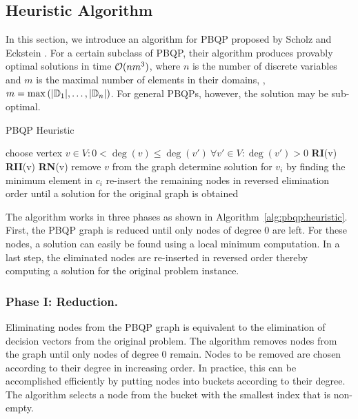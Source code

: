 \subsection{Heuristic Algorithm}
\label{sec:pbqp:heuristic}
In this section, we introduce an algorithm for PBQP proposed by
Scholz and Eckstein \cite{ScholzE02,Eck03}.  For a certain subclass of
PBQP, their algorithm produces provably optimal solutions in time
${\cal O}(n m^3)$, where $n$ is the number of discrete variables and
$m$ is the maximal number of elements in their domains, \ie, $m=\max
\left(|\mathbb D_1|,\ldots,|\mathbb D_n\right|)$. For general
{PBQP}s, however, the solution may be sub-optimal.

\begin{algorithm}
\caption{PBQP Heuristic}
\label{alg:pbqp:heuristic}
\begin{algorithmic}
  \STATE {}
  \STATE choose vertex $v \in V: 0 < \deg (v) \leq \deg (v') \ \forall v'
  \in V : \deg(v') > 0$
  \STATE \textbf{RI}(v)
  \STATE \textbf{RII}(v)
  \ELSE
  \STATE \textbf{RN}(v) 
  \ENDIF
  \STATE remove $v$ from the graph
  \ENDWHILE
  \STATE
  \STATE {}
  \STATE determine solution for $v_i$ by finding the minimum element
  in $c_i$
  \ENDFOR
  \STATE
  \STATE {}
  \STATE re-insert the remaining nodes in reversed elimination order
  until a solution for the original graph is obtained
\end{algorithmic}
\end{algorithm}
The algorithm works in three phases as shown in
Algorithm~\ref{alg:pbqp:heuristic}. First, the PBQP graph is reduced
until only nodes of degree $0$ are left. For these nodes, a solution
can easily be found using a local minimum computation. In a last step,
the eliminated nodes are re-inserted in reversed order thereby
computing a solution for the original problem instance.

\subsubsection{Phase I: Reduction.} Eliminating nodes from the PBQP graph
is equivalent to the elimination of decision vectors from the original
problem. The algorithm removes nodes from the graph until only nodes
of degree $0$ remain. Nodes to be removed are chosen according to
their degree in increasing order. In practice, this can be
accomplished efficiently by putting nodes into buckets according to
their degree. The algorithm selects a node from the bucket with the
smallest index that is non-empty.

